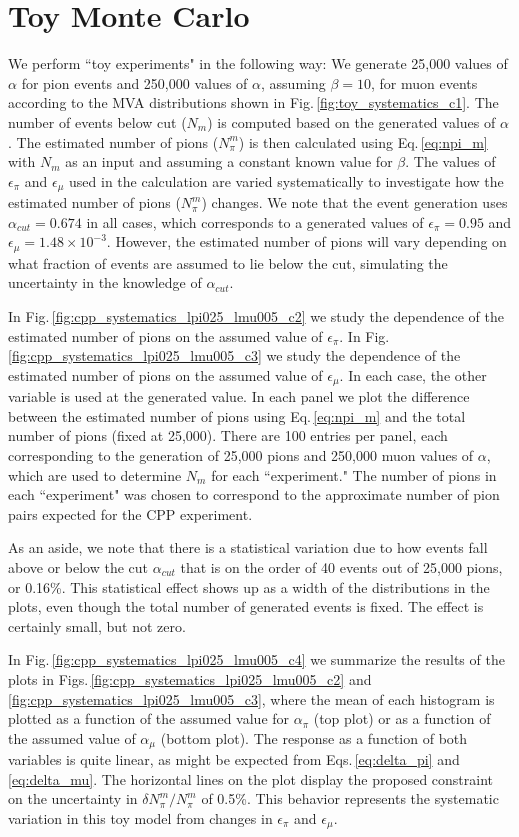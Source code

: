 \documentclass[12pt]{article}
\begin{document}
\section{Toy Monte Carlo}
We perform ``toy experiments" in the following way: We generate 25,000 values of $\alpha$ for pion events and 
250,000 values of $\alpha$, assuming $\beta=10$, for muon events according to the MVA distributions shown in Fig.\,\ref{fig:toy_systematics_c1}. The number of events below cut ($N_m$) is computed based on the generated values of $\alpha$.  The estimated number of pions ($N_\pi^m$) is then calculated using Eq.\,\ref{eq:npi_m} with $N_m$ as an input and assuming a constant known value for $\beta$. The values of $\epsilon_\pi$ and $\epsilon_\mu$ used in the calculation are varied systematically to investigate how the estimated number of pions ($N_\pi^m$) changes. We note that the event generation uses $\alpha_{cut}=0.674$ in all cases, which corresponds to a generated values of $\epsilon_\pi=0.95$ and $\epsilon_{\mu} = 1.48 \times 10^{-3}$. However, the estimated number of pions will vary depending on what fraction of events are assumed to lie below the cut, simulating the uncertainty in the knowledge of $\alpha_{cut}$. 

In Fig.\,\ref{fig:cpp_systematics_lpi025_lmu005_c2} we study the dependence of the estimated number of pions on the assumed value of $\epsilon_\pi$. In Fig.\,\ref{fig:cpp_systematics_lpi025_lmu005_c3} we study the dependence of the estimated number of pions on the assumed value of $\epsilon_\mu$. In each case, the other variable is used at the generated value.  In each panel we plot the difference between the estimated number of pions  using Eq.\,\ref{eq:npi_m} and the total number of pions (fixed at 25,000). There are 100 entries per panel, each corresponding to the generation of 25,000 pions and 250,000 muon values of $\alpha$, which are used to determine $N_m$ for each ``experiment." The number of pions in each ``experiment" was chosen to correspond to the approximate number of pion pairs expected for the CPP experiment. 

As an aside, we note that there is a statistical variation due to how events fall above or below the cut $\alpha_{cut}$ that is on the order of 40 events out of 25,000 pions, or 0.16\%.  This statistical effect shows up as a width of the distributions in the plots, even though the total number of generated events is fixed. The effect is certainly small, but not zero.

In Fig.\,\ref{fig:cpp_systematics_lpi025_lmu005_c4} we summarize the results of the plots in Figs.\,\ref{fig:cpp_systematics_lpi025_lmu005_c2} and \ref{fig:cpp_systematics_lpi025_lmu005_c3}, where the mean of each histogram is plotted as a function of the assumed value for $\alpha_\pi$ (top plot) or as a function of the assumed value of $\alpha_\mu$ (bottom plot). The response as a function of both variables is quite linear, as might be expected from Eqs.\,\ref{eq:delta_pi} and \ref{eq:delta_mu}. The horizontal lines on the plot display the proposed constraint on the uncertainty in $\delta N_\pi^m / N_\pi^m$ of 0.5\%. This behavior represents the systematic variation in this toy model from changes in $\epsilon_\pi$ and $\epsilon_\mu$.
\end{document}
